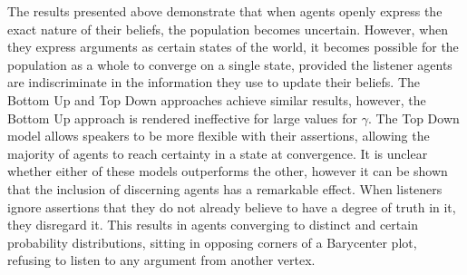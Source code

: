 The results presented above demonstrate that when agents openly express the exact nature of their beliefs, the population becomes uncertain. However, when they express arguments as certain states of the world, it becomes possible for the population as a whole to converge on a single state, provided the listener agents are indiscriminate in the information they use to update their beliefs. The Bottom Up and Top Down approaches achieve similar results, however, the Bottom Up approach is rendered ineffective for large values for $\gamma$. The Top Down model allows speakers to be more flexible with their assertions, allowing the majority of agents to reach certainty in a state at convergence. It is unclear whether either of these models outperforms the other, however it can be shown that the inclusion of discerning agents has a remarkable effect. When listeners ignore assertions that they do not already believe to have a degree of truth in it, they disregard it. This results in agents converging to distinct and certain probability distributions, sitting in opposing corners of a Barycenter plot, refusing to listen to any argument from another vertex.  